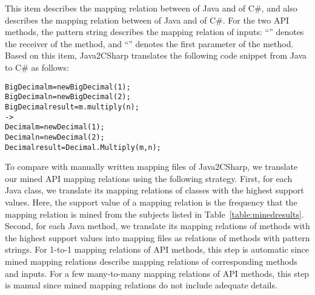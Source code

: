 This item describes the mapping relation between  of Java and  of C\#, and also describes the mapping relation between 
of Java and  of C\#. For the two API methods, the pattern
string describes the mapping relation of inputs:
``'' denotes the receiver of the 
method, and ``'' denotes the first parameter of the
 method. Based on this item, Java2CSharp translates
the following code snippet from Java to C\# as follows:

\begin{CodeOut}\vspace*{-2ex}
\begin{alltt}
  BigDecimal m = new BigDecimal(1);
  BigDecimal n = new BigDecimal(2);
  BigDecimal result = m.multiply(n);
  ->
  Decimal m = new Decimal(1);
  Decimal n = new Decimal(2);
  Decimal result = Decimal.Multiply(m,n);
\end{alltt}
\end{CodeOut}\vspace*{-2ex}

To compare with manually written mapping files of Java2CSharp, we
translate our mined API mapping relations using the following strategy. First,
for each Java class, we translate its mapping relations of classes
with the highest support values. Here, the support value of a mapping relation is the frequency that the mapping relation is mined from the subjects listed in Table~\ref{table:minedresults}. Second, for each Java method, we translate its
mapping relations of methods with the highest support values into mapping
files as relations of methods with pattern strings. For 1-to-1
mapping relations of API methods, this step is automatic since mined
mapping relations describe mapping relations of corresponding
methods and inputs. For a few many-to-many mapping relations of API methods,
this step is manual since mined mapping relations do not include
adequate details.

